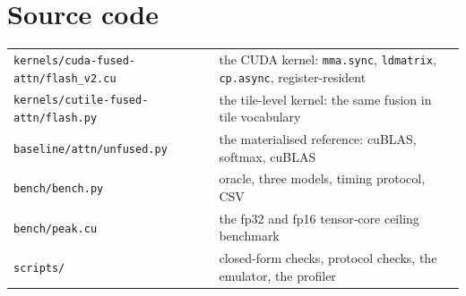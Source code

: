 \documentclass[10pt,a4paper]{article}
\begin{document}
\section*{Source code}
\begin{tabular}{@{}ll@{}}
\texttt{kernels/cuda-fused-attn/flash\_v2.cu} & the CUDA kernel: \texttt{mma.sync}, \texttt{ldmatrix},
\texttt{cp.async}, register-resident \\
\texttt{kernels/cutile-fused-attn/flash.py} & the tile-level kernel: the same fusion in tile vocabulary \\
\texttt{baseline/attn/unfused.py} & the materialised reference: cuBLAS, softmax, cuBLAS \\
\texttt{bench/bench.py} & oracle, three models, timing protocol, CSV \\
\texttt{bench/peak.cu} & the fp32 and fp16 tensor-core ceiling benchmark \\
\texttt{scripts/} & closed-form checks, protocol checks, the emulator, the profiler \\
\end{tabular}
\end{document}
